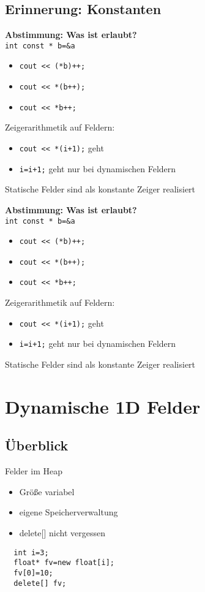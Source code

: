 \documentclass[16pt]{beamer}
\begin{document}
\subsection{Erinnerung: Konstanten}
\begin{frame}
  \textbf{Abstimmung: Was ist erlaubt?}
  \\\texttt{int const * b=\&a}%
  \begin{itemize}
    \item \texttt{cout << (*b)++;}%
    \item \texttt{cout << *(b++);}%
    \item \texttt{cout << *b++;}%
  \end{itemize}
  Zeigerarithmetik auf Feldern:
  \begin{itemize}
    \item \texttt{cout << *(i+1);} geht
    \item \texttt{i=i+1;} geht nur bei dynamischen Feldern
  \end{itemize}
  Statische Felder sind als konstante Zeiger realisiert
\end{frame}
\begin{frame}
  \textbf{Abstimmung: Was ist erlaubt?}
  \\\texttt{int const * b=\&a}%
  \begin{itemize}
    \item \texttt{cout << (*b)++;}%
    \item \texttt{cout << *(b++);}%
    \item \texttt{cout << *b++;}%
  \end{itemize}
  Zeigerarithmetik auf Feldern:
  \begin{itemize}
    \item \texttt{cout << *(i+1);} geht
    \item \texttt{i=i+1;} geht nur bei dynamischen Feldern
  \end{itemize}
  Statische Felder sind als konstante Zeiger realisiert
\end{frame}

\section{Dynamische 1D Felder}
\subsection{Überblick}
\begin{frame}[fragile]
Felder im Heap
  \begin{itemize}
    \item Größe variabel
    \item eigene Speicherverwaltung
    \item delete[] nicht vergessen
  \end{itemize}
  \begin{lstlisting}
  int i=3;
  float* fv=new float[i];
  fv[0]=10;
  delete[] fv;
  \end{lstlisting}
\end{frame}
\end{document}
